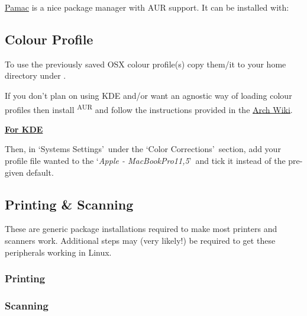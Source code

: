 \href{https://wiki.manjaro.org/index.php?title=Pamac}{Pamac} is a nice package manager with AUR support. It can be installed with:


\subsection{Colour Profile}

To use the previously saved OSX colour profile(s) copy them/it to your home directory under . 

If you don't plan on using KDE and/or want an agnostic way of loading colour profiles then install \textsuperscript{AUR} and follow the instructions provided in the \href{https://wiki.archlinux.org/index.php/mac#Color_Profile}{Arch Wiki}.

\textbf{\textcolor{textgrey}{\uline{For KDE}}}

\begin{blocksection}
	Then, in \lq Systems Settings\rq\ under the \lq Color Corrections\rq\ section, add your profile file wanted to the \lq\textit{Apple - MacBookPro11,5}\rq\ and tick it instead of the pre-given default.
\end{blocksection}

\subsection{Printing \& Scanning}

These are generic package installations required to make most printers and scanners work. Additional steps may (very likely!) be required to get these peripherals working in Linux.

\subsubsection{Printing}


\subsubsection{Scanning}


